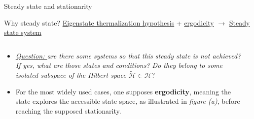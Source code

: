 \documentclass[10pt,xcolor={table,dvipsnames},t]{beamer}
\begin{document}
\begin{frame}{Steady state and stationarity}
  \begin{block}{Why steady state?}
    \centering
    \;\underline{Eigenstate thermalization hypothesis} + \underline{ergodicity} \hfill $\rightarrow$ \hfill \underline{Steady state system}\;
  \end{block}
  \begin{columns}
    \begin{column}{0.8\textwidth}
      \begin{itemize}
        \item<2-> \textsl{\underline{Question: } are there some systems so that this steady state is not achieved? If yes, 
          what are those states and conditions? Do they belong to some isolated subspace of the Hilbert space $\tilde{\mathcal{H}} \in \mathcal{H}$}\;? 
        \item<3-> For the most widely used cases, one supposes \textbf{ergodicity}, meaning the state explores the accessible state space, 
          as illustrated in \textit{figure (a)}, before reaching the supposed stationarity. 
      \end{itemize}
    \end{column}
    \begin{column}{0.2\textwidth}

  \end{column}
\end{columns}
\end{frame}
\end{document}
